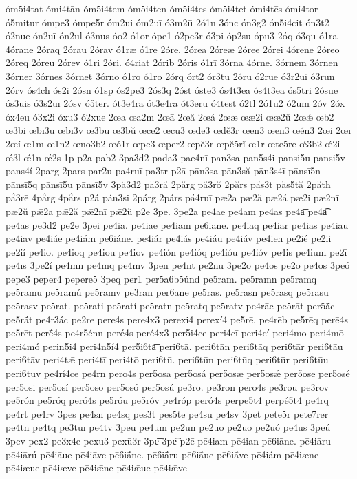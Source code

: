 {óm5i4tat
ómi4tān
óm5i4tem
óm5i4ten
óm5i4tes
óm5i4tet
ómi4tēs
ómi4tor
ó5mitur
ómpe3
ómpe5r
óm2ui
óm2uī
ó3m2ū
2ó1n
3ónc
ón3g2
ón5i4cit
ón3t2
ó2nue
ón2uī
ón2ul
ó3nus
óo2
ó1or
ópe1
ó2pe3r
ó3pi
óp2su
ópu3
2óq
ó3qu
ó1ra
4órane
2óraq
2órau
2órav
ó1ræ
ó1re
2óre.
2órea
2óreæ
2óree
2órei
4órene
2óreo
2óreq
2óreu
2órev
ó1ri
2óri.
ó4riat
2órib
2óris
ó1rī
3órna
4órne.
3órnem
3órnen
3órner
3órnes
3órnet
3órno
ó1ro
ó1rō
2órq
órt2
ór3tu
2óru
ó2rue
ó3r2ui
ó3run
2órv
ós4ch
ós2i
2ósn
ó1sp
ós2pe3
2ós3q
2óst
óste3
ós4t3ea
ós4t3eā
ós5tri
2ósue
ós3uis
ó3s2uī
2ósv
ó5ter.
ót3e4ra
ót3e4rā
ót3eru
ó4test
ó2tl
2ó1u2
ó2um
2óv
2óx
óx4eu
ó3x2i
óxu3
ó2xue
2œa
œa2m
2œā
2œă
2œá
2œæ
œæ2i
œæ2ŭ
2œǽ
œb2
œ3bi
œbī3u
œbī3v
œ3bu
œ3bŭ
œce2
œcu3
œde3
œdĕ3r
œen3
œēn3
œén3
2œi
2œī
2œí
œ1m
œ1n2
œno3b2
œó1r
œpe3
œper2
œpĕ3r
œpĕ5rĭ
œ1r
œte5re
œ́3b2
œ́2i
œ́3l
œ́1n
œ́2s
1p
p2a
pab2
3pa3d2
pada3
pae4nī
pan3sa
pan5s4i
pansi5u
pansi5v
pans4í
2parg
2pars
par2u
pa4ruī
pa3tr
p2ā
pān3sa
pān3să
pān3s4ī
pānsī5n
pānsī5q
pānsī5u
pānsī5v
3pă3d2
pă3ră
2părg
pă3rŏ
2părs
păs3t
păs5tă
2păth
pắ3rē
4pắrg
4pắrs
p2á
pán3si
2párg
2párs
pá4ruī
pæ2a
pæ2ă
pæ2á
pæ2i
pæ2nī
pæ2ŭ
pǣ2a
pǣ2ă
pǣ2nī
pǣ2ŭ
p2e
3pe.
3pe2a
pe4ae
pe4am
pe4as
pe4a͞
pe4a͡
pe4ās
pe3d2
pe2e
3pei
pe4ia.
pe4iae
pe4iam
pe6iane.
pe4iaq
pe4iar
pe4ias
pe4iau
pe4iav
pe4iáe
pe4iám
pe6iáne.
pe4iár
pe4iás
pe4iáu
pe4iáv
pe4ien
pe2ié
pe2ii
pe2ií
pe4io.
pe4ioq
pe4iou
pe4iov
pe4ión
pe4ióq
pe4ióu
pe4ióv
pe4is
pe4ium
pe2ī
pe4īs
3pe2í
pe4mn
pe4mq
pe4mv
3pen
pe4nt
pe2nu
3pe2o
pe4os
pe2ō
pe4ōs
3peó
pepe3
peper4
pepere5
3peq
per1
per5a6b5únd
pe5ram.
pe5ramn
pe5ramq
pe5ramu
pe5ramú
pe5ramv
pe3ran
per6ane
pe5ras.
pe5rasn
pe5rasq
pe5rasu
pe5rasv
pe5rat.
pe5rati
pe5ratí
pe5ratn
pe5ratq
pe5ratv
pe4rāc
pe5rāt
per5ā́c
pe5rā́t
pe4r3ác
pe2re
pere4s
pere4x3
perexi4
perexí4
pe5rē.
pe4rēb
pe5rēq
perē4s
pe5rēt
perḗ4s
pe4r5énn
peré4s
peré4x3
per5i4ce
peri4cī
peri4cí
peri4mo
peri4mō
peri4mó
perin5i4
peri4n5í4
per5i6ta͞
peri6tā.
peri6tān
peri6tāq
peri6tār
peri6tāu
peri6tāv
peri4tǣ
peri4tī
peri4tō
peri6tū.
peri6tūn
peri6tūq
peri6tūr
peri6tūu
peri6tūv
pe4rí4ce
pe4rn
pero4s
per5osa
per5osá
per5osæ
per5osǽ
per5ose
per5osé
per5osi
per5osí
per5oso
per5osó
per5osú
pe3rō.
pe3rōn
perō4s
pe3rōu
pe3rōv
pe5rṓn
pe5rṓq
perṓ4s
pe5rṓu
pe5rṓv
pe4róp
peró4s
perpe5t4
perpé5t4
pe4rq
pe4rt
pe4rv
3pes
pe4sn
pe4sq
pes3t
pes5te
pe4su
pe4sv
3pet
pete5r
pete7rer
pe4tn
pe4tq
pe3tuī
pe4tv
3peu
pe4um
pe2un
pe2uo
pe2uō
pe2uó
pe4us
3peú
3pev
pex2
pe3x4e
pexu3
pexū3r
3pe͞
3pe͡
p2ē
pē4iam
pē4ian
pē6iāne.
pē4iāru
pē4iārú
pē4iāue
pē4iāve
pē6iā́ne.
pē6iā́ru
pē6iā́ue
pē6iā́ve
pē4iám
pē4iæne
pē4iæue
pē4iæve
pē4iǣne
pē4iǣue
pē4iǣve
}
